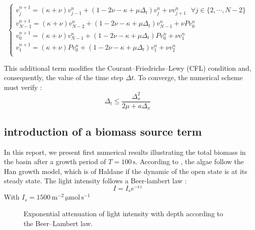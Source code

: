\documentclass{article}
\begin{document}
\[\begin{cases}
    v_j^{n+1} = (\kappa + \nu)v_{j-1}^n+ (1 - 2\nu - \kappa + \mu\Delta_t)v_j^n + \nu v_{j+1}^n \ \ \ \forall j \in \{2, \cdots, N-2\}\\
    v_{N-1}^{n+1} = (\kappa + \nu)v_{N-2}^n+ (1 - 2\nu - \kappa + \mu\Delta_t)v_{N-1}^n + \nu P v_{0}^n \\
    v_{0}^{n+1} = (\kappa + \nu)v_{N-1}^n+ (1 - 2\nu - \kappa + \mu\Delta_t)P v_0^n + \nu v_{1}^n \\
    v_{1}^{n+1} = (\kappa + \nu)P v_{0}^n+ (1 - 2\nu - \kappa + \mu\Delta_t)v_1^n + \nu v_{2}^n\\  
\end{cases} \]

This additional term modifies the Courant--Friedrichs--Lewy (CFL) condition and, consequently, the value of the time step $\Delta t$. To converge, the numerical scheme must verify : 
\[ \Delta_t \leq \frac{\Delta_x^2}{2\mu + a\Delta_x}\]



\subsection{introduction of a biomass source term}

In this report, we present first numerical results illustrating the total biomass in the basin after a growth period of $T = 100\,\mathrm{s}$. 
According to \cite{1}, the algae follow the Han growth model, which is of Haldane if the dynamic of the open state is at its steady state.
The light intensity follows a Beer-lambert law \cite{2}:
\[ I = I_s e^{-\epsilon z}\] 
With $I_s = 1500 \ \mathrm{m^{-2}\,\mu mol\,s^{-1}}$
\begin{figure}[H]
\centering
{}
\caption{Exponential attenuation of light intensity with depth according to the Beer--Lambert law.}
\label{fig:beer_lambert}
\end{figure}
\end{document}

